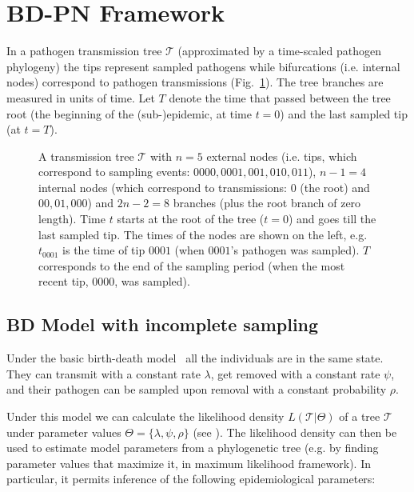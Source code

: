 \documentclass[a4paper,10pt]{article}
\begin{document}
\section{BD-PN Framework}
In a pathogen transmission tree $\mathscr{T}$ (approximated by a time-scaled pathogen phylogeny) the tips represent sampled pathogens %
while bifurcations (i.e. internal nodes) correspond to pathogen transmissions (Fig.~\ref{fig:tt}). The tree branches are measured in units of time. Let $T$ denote the time that passed between the tree root (the beginning of the (sub-)epidemic, at time $t=0$) and the last sampled tip (at $t=T$). 


\begin{figure}[tbhp]
\centering 

\caption{A transmission tree $\mathscr{T}$ with $n=5$ external nodes (i.e. tips, which correspond to sampling events: $0000, 0001, 001, 010, 011$), $n-1=4$ internal nodes (which correspond to transmissions: $0$ (the root) and $00, 01, 000$) and $2n - 2 = 8$ branches (plus the root branch of zero length). %
Time $t$ starts at the root of the tree ($t=0$) and goes till the last sampled tip. The times of the nodes are shown on the left, e.g. $t_{0001}$ is the time of tip $0001$ (when $0001$'s pathogen was sampled). $T$ corresponds to the end of the sampling period (when the most recent tip, $0000$, was sampled).}
\label{fig:tt} 
\end{figure}

\subsection{BD Model with incomplete sampling}
Under the basic birth-death model~\citep{Stadler2009} all the individuals are in the same state. They can transmit with a constant rate $\lambda$, get removed with a constant rate $\psi$, and their pathogen can be sampled upon removal with a constant probability $\rho$. 

Under this model we can calculate the likelihood density $L(\mathscr{T}|\Theta)$ of a tree $\mathscr{T}$ under parameter values $\Theta = \{\lambda, \psi, \rho\}$ (see ). The likelihood density can then be used to estimate model parameters from a phylogenetic tree (e.g. by finding parameter values that maximize it, in maximum likelihood framework). In particular, it permits inference of the following epidemiological parameters: 
\end{document}
